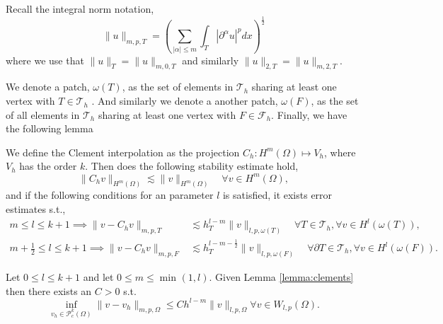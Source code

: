 Recall the integral norm notation,
\[
\| u \|_{ m,p,T }^{  } = \left( \sum_{ \left\lvert \alpha  \right\rvert \le m}^{} \int_{T}^{}  \left\lvert  \partial ^{\alpha } u \right\rvert^{p} dx   \right)^{\frac{1}{2}}
\]
where we use that $\| u \|_{ T  }^{  } = \| u \|_{ m,0,T  }^{  } $ and similarly $\| u \|_{ 2,T  }^{  } = \| u \|_{ m,2,T  }^{  }  $.

We denote a patch, $\omega \left( T \right) $, as the set of elements in $\mathcal{T} _{h}$  sharing at least one vertex with $T \in \mathcal{T} _{h}$ . And similarly we denote a another patch, $\omega \left( F \right) $, as the set of all elements in $\mathcal{T}_{h} $
sharing at least one vertex with $F \in  \mathcal{F} _{h}$. Finally, we have the following lemma

\begin{lemma}
    \label{lemma:clements}

We define the Clement interpolation as the projection
$C_{h}: H^{m} \left( \Omega  \right) \mapsto V_{h}$, where $V_{h}$ has the order $k$. Then does the following stability estimate hold,
\[
 \| C_{h} v \|_{H^{m}\left( \Omega  \right)   }^{  } \lesssim \| v \|_{ H^{m}\left( \Omega  \right)  }^{  } \quad \forall v \in H^{m}\left( \Omega  \right),
\]
and if the following conditions for an parameter $l$ is satisfied, it exists error estimates s.t.,
\[
    \begin{split}
      m\le l \le k+1  \implies \| v - C_{h} v \|_{ m,p,T   }^{  }  &  \lesssim h^{l-m}_{T} \| v \|_{l,p,\omega \left( T \right)  }^{  } \quad  \forall T \in \mathcal{T} _{h}, \forall v \in H^{l}( \omega \left( T \right)
      ), \\
      m +\frac{1}{2}\le l \le k+1  \implies \| v - C_{h} v \|_{ m,p,F }^{  } & \lesssim h^{l-m- \frac{1}{2}}_{T} \| v \|_{l,p,\omega \left( F \right)  }^{  } \quad  \forall \partial T \in \mathcal{T} _{h}, \forall v \in H^{l}( \omega \left( F
      \right)).
    \end{split}
\]

\end{lemma}


\begin{corollary}
    \label{cor:celement_apriori}
    Let $0 \le l \le k+1$ and let $0\le m \le \min_{} ( 1,l )$.
    Given Lemma \ref{lemma:clements}  then there exists an $C > 0$ s.t.
    \[
    \inf_{v_{h} \in \mathcal{P} ^{k}_{c}( \Omega ) } \| v - v_{h} \|_{  m,p,\Omega }^{  } \le C h^{l-m}  \| v \|_{ l,p,\Omega  }^{  }    \forall v \in W_{l,p}( \Omega ).
    \]
\end{corollary}


